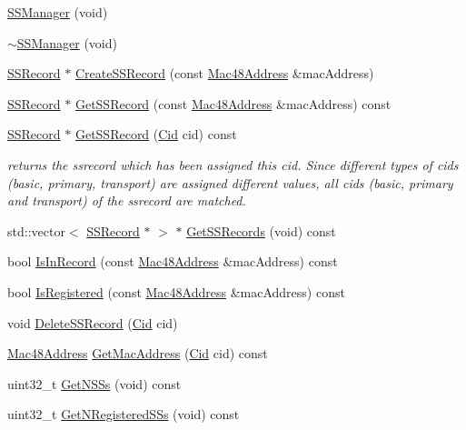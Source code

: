 \begin{DoxyCompactItemize}
\item 
\hyperlink{classns3_1_1SSManager_ad257acdaec1a0ba9cd896b629fa7c995}{S\+S\+Manager} (void)
\item 
\hyperlink{classns3_1_1SSManager_a02464cc012f208b0d40e66bcd667bcd6}{$\sim$\+S\+S\+Manager} (void)
\item 
\hyperlink{classns3_1_1SSRecord}{S\+S\+Record} $\ast$ \hyperlink{classns3_1_1SSManager_aaf1cb99d105cea2a303de19ee144876d}{Create\+S\+S\+Record} (const \hyperlink{classns3_1_1Mac48Address}{Mac48\+Address} \&mac\+Address)
\item 
\hyperlink{classns3_1_1SSRecord}{S\+S\+Record} $\ast$ \hyperlink{classns3_1_1SSManager_a6f4ef7c793e2d78bffe010f1b2adef6f}{Get\+S\+S\+Record} (const \hyperlink{classns3_1_1Mac48Address}{Mac48\+Address} \&mac\+Address) const 
\item 
\hyperlink{classns3_1_1SSRecord}{S\+S\+Record} $\ast$ \hyperlink{classns3_1_1SSManager_a6d9b81693fead19a46a0e3c2546906d1}{Get\+S\+S\+Record} (\hyperlink{classns3_1_1Cid}{Cid} cid) const 
\begin{DoxyCompactList}\small\item\em returns the ssrecord which has been assigned this cid. Since different types of cids (basic, primary, transport) are assigned different values, all cids (basic, primary and transport) of the ssrecord are matched. \end{DoxyCompactList}\item 
std\+::vector$<$ \hyperlink{classns3_1_1SSRecord}{S\+S\+Record} $\ast$ $>$ $\ast$ \hyperlink{classns3_1_1SSManager_a8dd320474e0266502c3319589cf8e186}{Get\+S\+S\+Records} (void) const 
\item 
bool \hyperlink{classns3_1_1SSManager_a545c577246d52d9b1a16aad729198764}{Is\+In\+Record} (const \hyperlink{classns3_1_1Mac48Address}{Mac48\+Address} \&mac\+Address) const 
\item 
bool \hyperlink{classns3_1_1SSManager_a486b9d022058a8e867d8a4bdf07e65d9}{Is\+Registered} (const \hyperlink{classns3_1_1Mac48Address}{Mac48\+Address} \&mac\+Address) const 
\item 
void \hyperlink{classns3_1_1SSManager_abb941db02350818fb56df8a0afe87cec}{Delete\+S\+S\+Record} (\hyperlink{classns3_1_1Cid}{Cid} cid)
\item 
\hyperlink{classns3_1_1Mac48Address}{Mac48\+Address} \hyperlink{classns3_1_1SSManager_a0e66f99d44deb36b01aa2a6b7abe7dc3}{Get\+Mac\+Address} (\hyperlink{classns3_1_1Cid}{Cid} cid) const 
\item 
uint32\+\_\+t \hyperlink{classns3_1_1SSManager_a5d8f07e839944e77c2dfce6ec7c30cfd}{Get\+N\+S\+Ss} (void) const 
\item 
uint32\+\_\+t \hyperlink{classns3_1_1SSManager_a3210327d56e134f873c216ea026f8aca}{Get\+N\+Registered\+S\+Ss} (void) const 
\end{DoxyCompactItemize}
